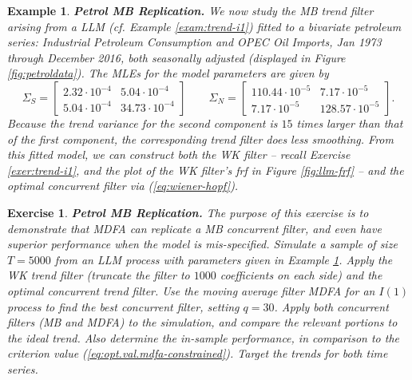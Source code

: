 \documentclass[a4paper]{book}
\newtheorem{Example}{Example}
\newtheorem{Exercise}{Exercise}
\begin{document}
\begin{Example} {\bf Petrol MB Replication.} \rm
\label{exam:petrol-mb}
We now  study the  MB trend filter arising from a LLM  
(cf. Example \ref{exam:trend-i1}) fitted
 to a   bivariate petroleum series:
  Industrial Petroleum Consumption and OPEC Oil Imports, Jan 1973 through December 2016,
 both seasonally adjusted  (displayed in Figure \ref{fig:petroldata}).
   The MLEs for the model parameters are  given by
\[
 \Sigma_{S} = \left[ \begin{array}{ll} 
   2.32 \cdot 10^{-4} &  5.04 \cdot 10^{-4} \\
   5.04 \cdot 10^{-4}  & 34.73 \cdot 10^{-4}  \end{array}  \right]
 \qquad  \Sigma_{N} = \left[ \begin{array}{ll}
        110.44 \cdot 10^{-5} &  7.17 \cdot 10^{-5}  \\
        7.17 \cdot 10^{-5} & 128.57 \cdot 10^{-5}   \end{array} \right].
\]
  Because the trend variance for the second component is $15$ times 
  larger than that of the first component,
 the corresponding trend filter  does less smoothing. 
 From this fitted model,  we can construct both the WK filter -- recall Exercise
  \ref{exer:trend-i1}, and the plot of the WK filter's frf in Figure \ref{fig:llm-frf} --
  and the optimal concurrent filter via (\ref{eq:wiener-hopf}).
\end{Example}

\begin{Exercise} {\bf Petrol MB Replication.}  \rm
\label{exer:petrol-mb1}
 The purpose of this exercise is to demonstrate that MDFA can replicate
 a MB concurrent filter, and even have superior performance when the 
 model is mis-specified. 
 Simulate a sample of size $T=5000$ from an LLM process with parameters
 given in Example \ref{exam:petrol-mb}.   Apply the WK trend filter
(truncate the filter to $1000$ coefficients on each side) and the 
 optimal concurrent trend filter.  
 Use the moving average filter  MDFA  for an $I(1)$ process  to find the best
 concurrent filter, setting $q= 30$.
    Apply both concurrent filters (MB and MDFA)
 to the simulation, and compare the relevant portions to the ideal trend.
 Also determine the in-sample performance, in comparison to the criterion value
 (\ref{eq:opt.val.mdfa-constrained}).   Target the trends for both time series.
\end{Exercise}
\end{document}
